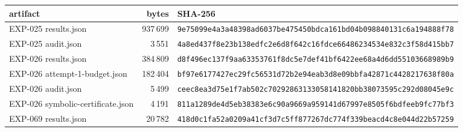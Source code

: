 \begin{tabular}{@{}lrl@{}}
\toprule
artifact & bytes & SHA-256\\
\midrule
EXP-025 results.json & 937\,699 & \texttt{\scriptsize 9e75099e4a3a48398ad6037be475450bdca161bd04b098840131c6a194888f78}\\
EXP-025 audit.json & 3\,551 & \texttt{\scriptsize 4a8ed437f8e23b138edfc2e6d8f642c16fdce66486234534e832c3f58d415bb7}\\
EXP-026 results.json & 384\,809 & \texttt{\scriptsize d8f496ec137f9aa63353761f8dc5e7def41bf6422ee68a4d6dd55103668989b9}\\
EXP-026 attempt-1-budget.json & 182\,404 & \texttt{\scriptsize bf97e6177427ec29fc56531d72b2e94eab3d8e09bbfa42871c4428217638f80a}\\
EXP-026 audit.json & 5\,499 & \texttt{\scriptsize ceec8ea3d75e1f7ab502c70292863133058141820bb38073595c292d08045e9c}\\
EXP-026 symbolic-certificate.json & 4\,191 & \texttt{\scriptsize 811a1289de4d5eb38383e6c90a9669a959141d67997e8505f6bdfeeb9fc77bf3}\\
EXP-069 results.json & 20\,782 & \texttt{\scriptsize 418d0c1fa52a0209a41cf3d7c5ff877267dc774f339beacd4c8e044d22b57259}\\
\bottomrule
\end{tabular}
